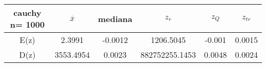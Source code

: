 \begin{tabular}{|c|c|c|c|c|c|}
\hline
cauchy n= 1000& $\overline{x}$ & mediana & $z_r$ & $z_Q$ & $z_{tr}$ \\ \hline
E(z) & 2.3991 & -0.0012 & 1206.5045 & -0.001 & 0.0015 \\ \hline
D(z) & 3553.4954 & 0.0023 & 882752255.1453 & 0.0048 & 0.0024 \\ \hline
\end{tabular}